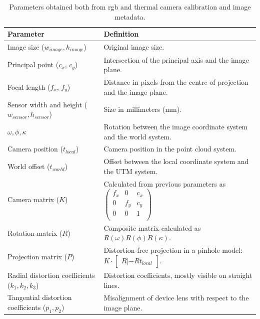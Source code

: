 \renewcommand{\arraystretch}{1.15}
\begin{table}
    \sffamily\small
    \caption{Parameters obtained both from \acrshort{rgb} and thermal camera calibration and image metadata.}
    \label{table:thermal_pc_attributes}
    \begin{tabular}{@{}l@{\hskip 0.55in}l@{}}
    \toprule
    Parameter & Definition\\
    \midrule
    Image size ($w_{\textit{image}}, h_{\textit{image}}$) & Original image size.\\
    Principal point ($c_x$, $c_y$) & Intersection of the principal axis and the image plane. \\
    Focal length ($f_x$, $f_y$) & Distance in pixels from the centre of projection and the image plane. \\
    Sensor width and height ($w_{\textit{sensor}}, h_{\textit{sensor}}$) & Size in millimeters (\si{\milli\meter}). \\
    $\omega, \phi, \kappa$ & Rotation between the image coordinate system and the world system. \\
    Camera position ($t_{\textit{local}}$) & Camera position in the point cloud system.\\
    World offset ($t_{\textit{world}}$) & Offset between the local coordinate system and the UTM system.\\
    Camera matrix ($K$) & Calculated from previous parameters as $\begin{pmatrix} f_x & 0 & c_x\\ 0 & f_y & c_y\\ 0 & 0 & 1\\ \end{pmatrix}$ \\
    Rotation matrix ($R$) & Composite matrix calculated as $R(\omega)R(\phi)R(\kappa)$. \\
    Projection matrix ($P$) & Distortion-free projection in a pinhole model: $K \cdot \begin{bmatrix} R|-Rt_{\textit{local}} \end{bmatrix}$. \\
    Radial distortion coefficients ($k_1, k_2, k_3$) & Distortion coefficients, mostly visible on straight lines.\\
    Tangential distortion coefficients ($p_1, p_2$) & Misalignment of device lens with respect to the image plane. \\
    \bottomrule
    \end{tabular}
    \normalsize
\end{table}
\renewcommand{\arraystretch}{1}    

